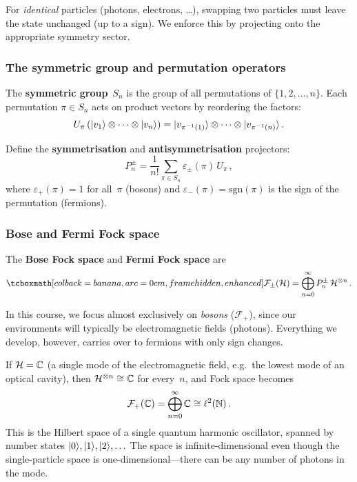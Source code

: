 For \emph{identical} particles (photons, electrons, \ldots), swapping
two particles must leave the state unchanged (up to a sign).  We
enforce this by projecting onto the appropriate symmetry sector.

\subsubsection{The symmetric group and permutation operators}

The \textbf{symmetric group}~$S_n$ is the group of all permutations of
$\{1,2,\ldots,n\}$.  Each permutation $\pi \in S_n$ acts on product
vectors by reordering the factors:
\begin{equation}\label{eq:perm-action}
  U_\pi\,(\lvert v_1 \rangle \otimes \cdots \otimes \lvert v_n \rangle)
  = \lvert v_{\pi^{-1}(1)} \rangle \otimes \cdots \otimes \lvert v_{\pi^{-1}(n)} \rangle\,.
\end{equation}

Define the \textbf{symmetrisation} and \textbf{antisymmetrisation}
projectors:
\begin{equation}\label{eq:sym-projectors}
  P_n^{\pm}
  = \frac{1}{n!}\sum_{\pi \in S_n}
    \varepsilon_\pm(\pi)\, U_\pi\,,
\end{equation}
where $\varepsilon_+(\pi) = 1$ for all~$\pi$ (bosons) and
$\varepsilon_-(\pi) = \mathrm{sgn}(\pi)$ is the sign of the
permutation (fermions).

\subsubsection{Bose and Fermi Fock space}

\begin{definition}\label{def:bose-fermi-fock}
  The \textbf{Bose Fock space} and \textbf{Fermi Fock space} are
  \begin{equation}\label{eq:bose-fermi-fock}
    \eqbox{\mathcal{F}_\pm(\hilb)
      = \bigoplus_{n=0}^{\infty} P_n^{\pm}\,\hilb^{\tp n}}\,.
  \end{equation}
\end{definition}

In this course, we focus almost exclusively on \emph{bosons}
($\mathcal{F}_+$), since our environments will typically be
electromagnetic fields (photons).  Everything we develop, however,
carries over to fermions with only sign changes.

\begin{example}\label{ex:single-mode}
  If $\mathcal{H} = \mathbb{C}$ (a single mode of the electromagnetic field, e.g.\
  the lowest mode of an optical cavity), then
  $\mathcal{H}^{\otimes n} \cong \mathbb{C}$ for every~$n$, and Fock space becomes
  \begin{equation}\label{eq:single-mode-fock}
    \mathcal{F}_+(\mathbb{C}) = \bigoplus_{n=0}^{\infty} \mathbb{C}
    \cong \ell^2(\mathbb{N})\,.
  \end{equation}
  This is the Hilbert space of a single quantum harmonic oscillator,
  spanned by number states $\lvert 0 \rangle, \lvert 1 \rangle, \lvert 2 \rangle, \ldots$ The
  space is infinite-dimensional even though the single-particle space
  is one-dimensional---there can be any number of photons in the mode.
\end{example}

